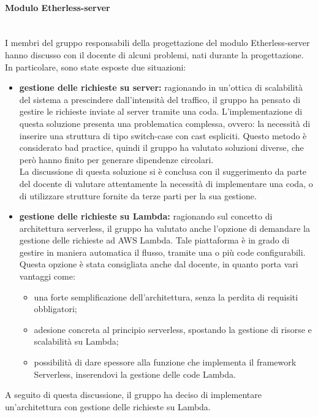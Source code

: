 	\paragraph{Modulo Etherless-server}\mbox{}\\
		I membri del gruppo responsabili della progettazione del modulo Etherless-server hanno discusso con il docente di alcuni problemi, nati durante la progettazione. In particolare, sono state esposte due situazioni:
		\begin{itemize}
			\item \textbf{gestione delle richieste su server:} ragionando in un’ottica di scalabilità del sistema a prescindere dall’intensità del traffico, il gruppo ha pensato di gestire le richieste inviate al server tramite una coda. L’implementazione di questa soluzione presenta una problematica complessa, ovvero: la necessità di inserire una struttura di tipo switch-case con cast espliciti. Questo metodo è considerato bad practice, quindi il gruppo ha valutato soluzioni diverse, che però hanno finito per generare dipendenze circolari.\\La discussione di questa soluzione si è conclusa con il suggerimento da parte del docente di valutare attentamente la necessità di implementare una coda, o di utilizzare strutture fornite da terze parti per la sua gestione.
			\item \textbf{gestione delle richieste su Lambda:} ragionando sul concetto di architettura serverless, il gruppo ha valutato anche l’opzione di demandare la gestione delle richieste ad AWS Lambda. Tale piattaforma è in grado di gestire in maniera automatica il flusso, tramite una o più code configurabili. Questa opzione è stata consigliata anche dal docente, in quanto porta vari vantaggi come:
			\begin{itemize}
				\item una forte semplificazione dell’architettura, senza la perdita di requisiti obbligatori;
				\item adesione concreta al principio serverless, spostando la gestione di risorse e scalabilità su Lambda;
				\item possibilità di dare spessore alla funzione che implementa il framework Serverless, inserendovi la gestione delle code Lambda.
			\end{itemize}
		\end{itemize}
		A seguito di questa discussione, il gruppo ha deciso di implementare un'architettura con gestione delle richieste su Lambda.
